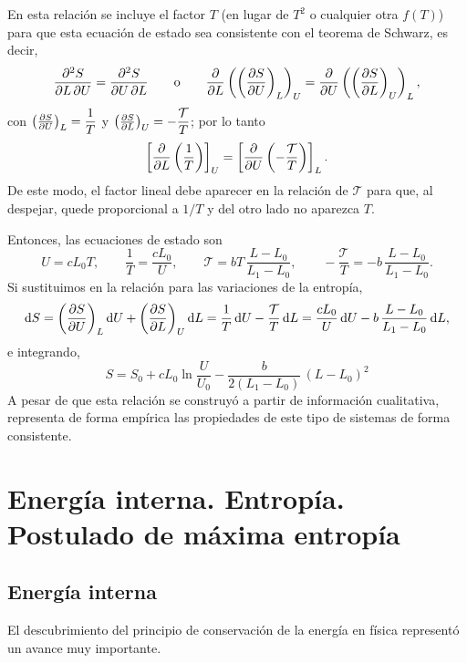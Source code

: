 En esta relación se incluye el factor $T$ (en lugar de $T^{2}$ o cualquier otra $f(T)$) para que esta
ecuación de estado sea consistente con el teorema de Schwarz, es decir,
\begin{equation*}
  \frac{\partial^{2}S}{\partial L\,\partial U}=\frac{\partial^{2}S}{\partial U\,\partial L}
  \qquad\text{o}\qquad
  \pdv{L}\left(\left(\frac{\partial S}{\partial U}\right)_{L}\right)_{U}=\pdv{U}\left(\left(\frac{\partial S}{\partial L}\right)_{U}\right)_{L},
\end{equation*}
con $\left(\frac{\partial S}{\partial U}\right)_{L}=\dfrac{1}{T}$ y $\left(\frac{\partial S}{\partial L}\right)_{U}=-\dfrac{\mathcal{T}}{T}$; por lo tanto
\begin{equation*}
  \left[\pdv{L}\left(\frac{1}{T}\right)\right]_{U}=\left[\pdv{U}\left(-\frac{\mathcal{T}}{T}\right)\right]_{L}.
\end{equation*}
De este modo, el factor lineal debe aparecer en la relación de $\mathcal{T}$ para que, al despejar,
quede proporcional a $1/T$ y del otro lado no aparezca $T$.

Entonces, las ecuaciones de estado son
\begin{equation*}
  U=cL_0T,\qquad\frac{1}{T}=\frac{cL_0}{U},\qquad
  \mathcal{T}=bT\,\frac{L-L_0}{L_1-L_0},\qquad-\frac{\mathcal{T}}{T}=-b\,\frac{L-L_0}{L_1-L_0}.
\end{equation*}
Si sustituimos en la relación para las variaciones de la entropía,
\begin{equation*}
  \dd S=\left(\frac{\partial S}{\partial U}\right)_{L}\dd U+\left(\frac{\partial S}{\partial L}\right)_{U}\dd L
  =\frac{1}{T}\,\dd U-\frac{\mathcal{T}}{T}\,\dd L
  =\frac{cL_0}{U}\,\dd U-b\,\frac{L-L_0}{L_1-L_0}\,\dd L,
\end{equation*}
e integrando,
\begin{equation*}
  \boxed{S=S_0+cL_0\ln\frac{U}{U_0}-\frac{b}{2(L_1-L_0)}\,(L-L_0)^{2}}
\end{equation*}
A pesar de que esta relación se construyó a partir de información cualitativa, representa de forma
empírica las propiedades de este tipo de sistemas de forma consistente.

\section{Energía interna. Entropía. Postulado de máxima entropía}

\subsection*{Energía interna}

El descubrimiento del principio de conservación de la energía en física representó un avance muy
importante.

